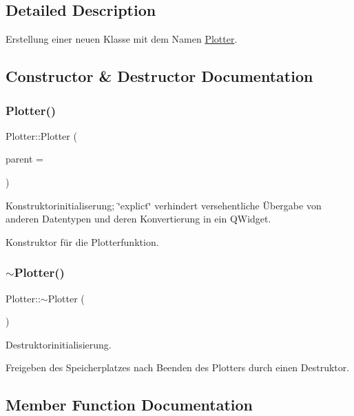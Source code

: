 \subsection{Detailed Description}
Erstellung einer neuen Klasse mit dem Namen \hyperlink{class_plotter}{Plotter}. 

\subsection{Constructor \& Destructor Documentation}
\mbox{\label{class_plotter_a367b6890c36910a27ec710ac3693e64b}} 
\subsubsection{\texorpdfstring{Plotter()}{Plotter()}}
{\footnotesize\ttfamily Plotter\+::\+Plotter (\begin{DoxyParamCaption}\item[{Q\+Widget $\ast$}]{parent = {} }\end{DoxyParamCaption})\hspace{0.3cm}{\ttfamily [explicit]}}



Konstruktorinitialiserung; \char`\"{}explict\char`\"{} verhindert versehentliche Übergabe von anderen Datentypen und deren Konvertierung in ein Q\+Widget. 

Konstruktor für die Plotterfunktion. \mbox{\label{class_plotter_acd0883f9597a6b3bfcca0fce926809a0}} 
\subsubsection{\texorpdfstring{$\sim$\+Plotter()}{~Plotter()}}
{\footnotesize\ttfamily Plotter\+::$\sim$\+Plotter (\begin{DoxyParamCaption}{ }\end{DoxyParamCaption})}



Destruktorinitialisierung. 

Freigeben des Speicherplatzes nach Beenden des Plotters durch einen Destruktor. 

\subsection{Member Function Documentation}
\mbox{\label{class_plotter_a4808217f2ec95082cee4c239b707fcc3}} 
